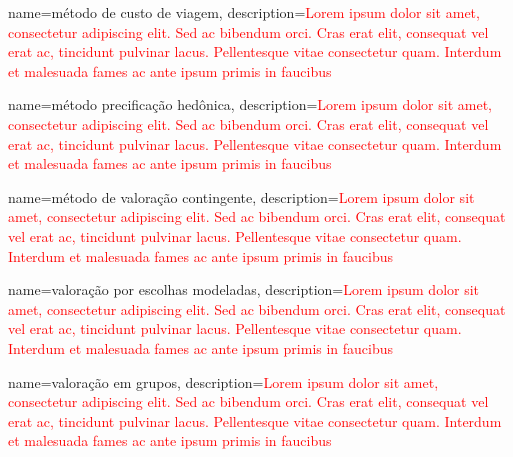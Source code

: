 {
	name=método de custo de viagem,
	description={\textcolor{red}{Lorem ipsum dolor sit amet, consectetur adipiscing elit. Sed ac bibendum orci. Cras erat elit, consequat vel erat ac, tincidunt pulvinar lacus. Pellentesque vitae consectetur quam. Interdum et malesuada fames ac ante ipsum primis in faucibus}}
}

{
	name=método precificação hedônica,
	description={\textcolor{red}{Lorem ipsum dolor sit amet, consectetur adipiscing elit. Sed ac bibendum orci. Cras erat elit, consequat vel erat ac, tincidunt pulvinar lacus. Pellentesque vitae consectetur quam. Interdum et malesuada fames ac ante ipsum primis in faucibus}}
}

{
	name=método de valoração contingente,
	description={\textcolor{red}{Lorem ipsum dolor sit amet, consectetur adipiscing elit. Sed ac bibendum orci. Cras erat elit, consequat vel erat ac, tincidunt pulvinar lacus. Pellentesque vitae consectetur quam. Interdum et malesuada fames ac ante ipsum primis in faucibus}}
}

{
	name=valoração por escolhas modeladas,
	description={\textcolor{red}{Lorem ipsum dolor sit amet, consectetur adipiscing elit. Sed ac bibendum orci. Cras erat elit, consequat vel erat ac, tincidunt pulvinar lacus. Pellentesque vitae consectetur quam. Interdum et malesuada fames ac ante ipsum primis in faucibus}}
}

{
	name=valoração em grupos,
	description={\textcolor{red}{Lorem ipsum dolor sit amet, consectetur adipiscing elit. Sed ac bibendum orci. Cras erat elit, consequat vel erat ac, tincidunt pulvinar lacus. Pellentesque vitae consectetur quam. Interdum et malesuada fames ac ante ipsum primis in faucibus}}
}
